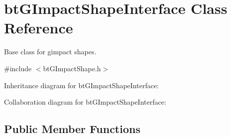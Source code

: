 \hypertarget{classbt_g_impact_shape_interface}{\section{bt\+G\+Impact\+Shape\+Interface Class Reference}
\label{classbt_g_impact_shape_interface}
}


Base class for gimpact shapes.  




{\ttfamily \#include $<$bt\+G\+Impact\+Shape.\+h$>$}



Inheritance diagram for bt\+G\+Impact\+Shape\+Interface\+:


Collaboration diagram for bt\+G\+Impact\+Shape\+Interface\+:
\subsection*{Public Member Functions}
